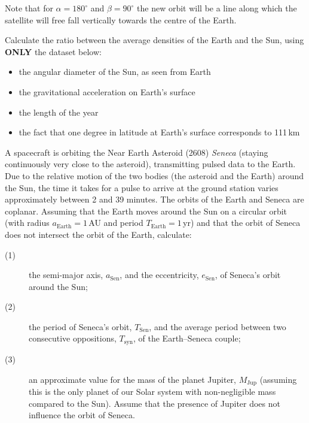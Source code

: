 Note that for $\alpha = 180^\circ$ and $\beta = 90^\circ$ the new orbit will be
a line along which the satellite will free fall vertically towards the centre
of the Earth.

Calculate the ratio between the average densities of the Earth and the Sun,
using \textbf{ONLY} the dataset below:
\begin{itemize}
\item the angular diameter of the Sun, as seen from Earth
\item the gravitational acceleration on Earth's surface
\item the length of the year
\item the fact that one degree in latitude at Earth's surface corresponds to
  111\,km
\end{itemize}

A spacecraft is orbiting the Near Earth Asteroid (2608) \textit{Seneca}
(staying continuously very close to the asteroid), transmitting pulsed data to
the Earth. Due to the relative motion of the two bodies (the asteroid and the
Earth) around the Sun, the time it takes for a pulse to arrive at the ground
station varies approximately between 2 and 39 minutes. The orbits of the Earth
and Seneca are coplanar. Assuming that the Earth moves around the Sun on a
circular orbit (with radius $a_{\mathrm{Earth}} = 1$\,AU and period
$T_{\mathrm{Earth}} = 1$\,yr) and that the orbit of Seneca does not intersect
the orbit of the Earth, calculate:

\begin{description}
\item[(1)] the semi-major axis, $a_{\mathrm{Sen}}$, and the eccentricity,
  $e_{\mathrm{Sen}}$, of Seneca's orbit around the Sun;
\item[(2)] the period of Seneca's orbit, $T_{\mathrm{Sen}}$, and the average
  period between two consecutive oppositions, $T_{\mathrm{syn}}$, of the
  Earth--Seneca couple;
\item[(3)] an approximate value for the mass of the planet Jupiter,
  $M_{\mathrm{Jup}}$ (assuming this is the only planet of our Solar system with
  non-negligible mass compared to the Sun). Assume that the presence of
  Jupiter does not influence the orbit of Seneca.
\end{description}

